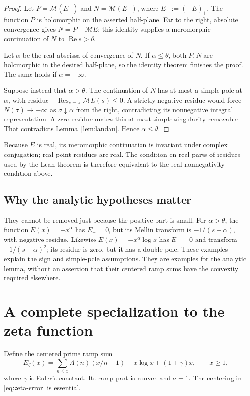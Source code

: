\documentclass[11pt]{article}
\theoremstyle{definition}
\newcommand{\Res}{\operatorname{Res}}
\newcommand{\Rea}{\operatorname{Re}}
\newcommand{\Mell}{\mathcal M}
\begin{document}
\begin{proof}
Let \(P=\Mell(E_+)\) and \(N=\Mell(E_-)\), where
\(E_-:=(-E)_+\). The function \(P\) is holomorphic on the asserted
half-plane. Far to the right, absolute convergence gives
\(N=P-\Mell E\); this identity supplies a meromorphic continuation
of \(N\) to \(\Rea s>\theta\).

Let \(\alpha\) be the real abscissa of convergence of \(N\).
If \(\alpha\leq\theta\), both \(P,N\) are holomorphic in the desired
half-plane, so the identity theorem finishes the proof. The same holds
if \(\alpha=-\infty\).

Suppose instead that \(\alpha>\theta\). The continuation of \(N\)
has at most a simple pole at \(\alpha\), with residue
\(-\Res_{s=\alpha}\Mell E(s)\leq0\). A strictly negative residue
would force \(N(\sigma)\to-\infty\) as \(\sigma\downarrow\alpha\)
from the right, contradicting its nonnegative integral representation.
A zero residue makes this at-most-simple singularity removable.
That contradicts Lemma~\ref{lem:landau}. Hence \(\alpha\leq\theta\).
\end{proof}

Because \(E\) is real, its meromorphic continuation is invariant under
complex conjugation; real-point residues are real. The condition on
real parts of residues used by the Lean theorem is therefore equivalent
to the real nonnegativity condition above.

\subsection{Why the analytic hypotheses matter}

They cannot be removed just because the positive part is small. For
\(\alpha>\theta\), the function \(E(x)=-x^\alpha\) has \(E_+=0\),
but its Mellin transform is \(-1/(s-\alpha)\), with negative residue.
Likewise \(E(x)=-x^\alpha\log x\) has \(E_+=0\) and transform
\(-1/(s-\alpha)^2\); its residue is zero, but it has a double pole.
These examples explain the sign and simple-pole assumptions. They are
examples for the analytic lemma, without an assertion that their
centered ramp sums have the convexity required elsewhere.

\section{A complete specialization to the zeta function}
\label{sec:zeta}

Define the centered prime ramp sum
\begin{equation}\label{eq:zeta-error}
 E_\zeta(x)=\sum_{n\leq x}\Lambda(n)(x/n-1)
             -x\log x+(1+\gamma)x,\qquad x\geq1,
\end{equation}
where \(\gamma\) is Euler's constant. Its ramp part is convex and
\(a=1\). The centering in \eqref{eq:zeta-error} is essential.
\end{document}
